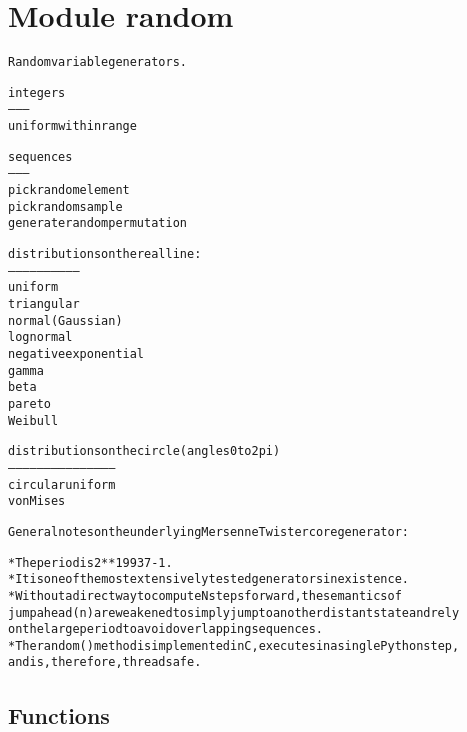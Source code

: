%
%
%


\section{Module random}

    \label{random}
\begin{alltt}
Random variable generators.

    integers
    --------
           uniform within range

    sequences
    ---------
           pick random element
           pick random sample
           generate random permutation

    distributions on the real line:
    ------------------------------
           uniform
           triangular
           normal (Gaussian)
           lognormal
           negative exponential
           gamma
           beta
           pareto
           Weibull

    distributions on the circle (angles 0 to 2pi)
    ---------------------------------------------
           circular uniform
           von Mises

General notes on the underlying Mersenne Twister core generator:

* The period is 2**19937-1.
* It is one of the most extensively tested generators in existence.
* Without a direct way to compute N steps forward, the semantics of
  jumpahead(n) are weakened to simply jump to another distant state and rely
  on the large period to avoid overlapping sequences.
* The random() method is implemented in C, executes in a single Python step,
  and is, therefore, threadsafe.
\end{alltt}



  \subsection{Functions}

